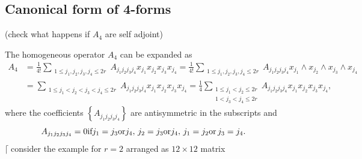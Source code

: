\documentclass[aps, preprint]{revtex4}
\begin{document}
\subsection{Canonical form of 4-forms}
(check what happens if $A_{4}$ are self adjoint) 

The homogeneous operator $A_{4}$ can be expanded as
\begin{align}A_{4} &  =\frac{1}{4 !} \sum _{\begin{array}{c}1 \leq j_{1} ,j_{2} ,j_{3} ,j_{4} \leq 2 r\end{array}}A_{j_{1} j_{2} j_{3} j_{4}} x_{j_{1}} x_{j_{2}} x_{j_{3}} x_{j_{4}} =\frac{1}{4 !} \sum _{\begin{array}{c}1 \leq j_{1} ,j_{2} ,j_{3} ,j_{4} \leq 2 r\end{array}}A_{j_{1} j_{2} j_{3} j_{4}} x_{j_{1}} \wedge x_{j_{2}} \wedge x_{j_{3}} \wedge x_{j_{4}} \\
 &  =\sum _{\begin{array}{c}1 \leq j_{1} <j_{2} <j_{3} <j_{4} \leq 2 r\end{array}}A_{j_{1} j_{2} j_{3} j_{4}} x_{j_{1}} x_{j_{2}} x_{j_{3}} x_{j_{4}} =\frac{1}{4} \sum _{\begin{array}{c}1 \leq j_{1} <j_{2} \leq 2 r \\
1 <j_{3} <j_{4} \leq 2 r\end{array}}A_{j_{1} j_{2} j_{3} j_{4}} x_{j_{1}} x_{j_{2}} x_{j_{3}} x_{j_{4}}\text{,}\end{align}where the coefficients $\left \{A_{j_{1} j_{2} j_{3} j_{4}}\right \}$ are antisymmetric in the subscripts and
\begin{equation*}A_{j_{1} j_{2} j_{3} j_{4}} =0\text{if}j_{1} =j_{3}\text{or}j_{4} ,\,j_{2} =j_{3}\text{or}j_{4} ,\,j_{1} =j_{2}\text{or}\,j_{3} =j_{4} .\text{\quad \quad \quad }
\end{equation*}$\lceil \;$consider the example for $r =2$ arranged as $12 \times 12$ matrix
\end{document}
